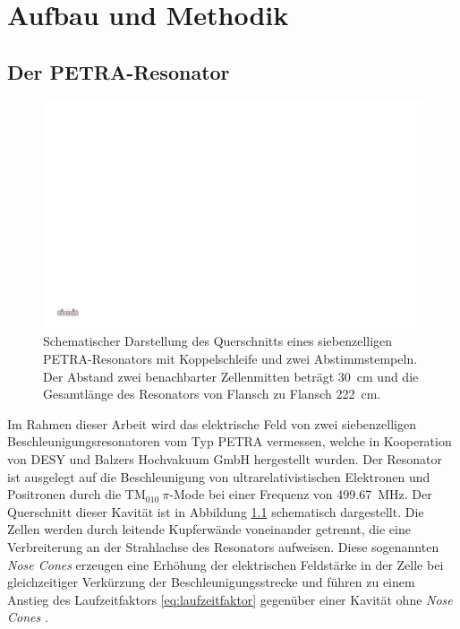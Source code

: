 \chapter{Aufbau und Methodik}
\label{sec:aufbau_und_methodik}

\section{Der PETRA-Resonator}
\label{sec:petra_resonator}
\begin{figure}[htb]
  \centering
  \includegraphics[scale=0.6875]{./figs/cavity/cavity.pdf}
  \caption[Schematische Darstellung des Querschnitts eines siebenzelligen PETRA-Resonators mit Koppelschleife und zwei Abstimmstempeln]{Schematischer Darstellung des Querschnitts eines siebenzelligen PETRA-Resonators mit Koppelschleife und zwei Abstimmstempeln. Der Abstand zwei benachbarter Zellenmitten beträgt \SI{30}{\centi\metre} und die Gesamtlänge des Resonators von Flansch zu Flansch \SI{222}{\centi\metre}.}
  \label{fig:petra_cavity}
\end{figure}
Im Rahmen dieser Arbeit wird das elektrische Feld von zwei siebenzelligen Beschleunigungsresonatoren vom Typ PETRA \cite{desy_petra} vermessen, welche in Kooperation von DESY und Balzers Hochvakuum GmbH hergestellt wurden.
Der Resonator ist ausgelegt auf die Beschleunigung von ultrarelativistischen Elektronen und Positronen durch die $\mathrm{TM}_{010}~\pi$-Mode bei einer Frequenz von \SI{499.67}{MHz}.
Der Querschnitt dieser Kavität ist in Abbildung \ref{fig:petra_cavity} schematisch dargestellt.
Die Zellen werden durch leitende Kupferwände voneinander getrennt, die eine Verbreiterung an der Strahlachse des Resonators aufweisen.
Diese sogenannten \textit{Nose Cones} erzeugen eine Erhöhung der elektrischen Feldstärke in der Zelle bei gleichzeitiger Verkürzung der Beschleunigungsstrecke und führen zu einem Anstieg des Laufzeitfaktors \eqref{eq:laufzeitfaktor} gegenüber einer Kavität ohne \textit{Nose Cones} \cite[S.\ 48]{wangler}.

